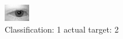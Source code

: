 \begin{figure}[h!]
\begin{center}
\includegraphics[width=0.60\columnwidth]{figures/ID491_class_1_target_2.png}
\end{center}
\caption{ Classification: 1 actual target: 2}
\label{fig:ID491_class_1_target_2}
\end{figure}
